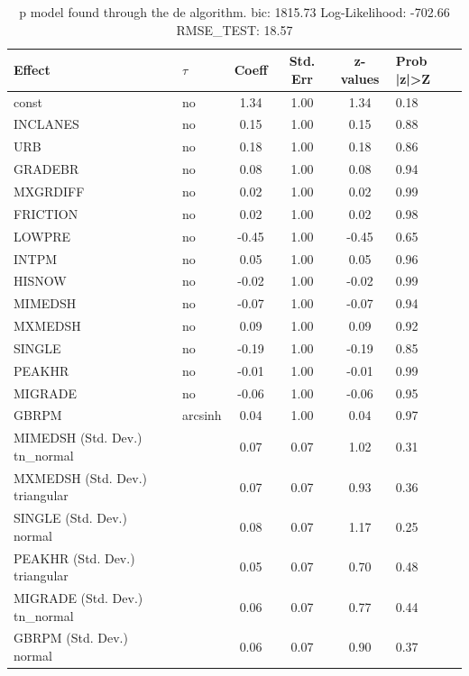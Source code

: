 \begin{table}
	\caption{p model found through the de algorithm. bic: 1815.73 Log-Likelihood: -702.66 RMSE_TEST: 18.57}
	\begin{center}
		\begin{tabular}{|l|l|c|c|c|l|}
			\hline
			Effect & $\tau$ & Coeff & Std. Err & z-values & Prob |z|>Z \\
			\hline
			const & no & 1.34 & 1.00 & 1.34 & 0.18 \\
			\hline
			INCLANES & no & 0.15 & 1.00 & 0.15 & 0.88 \\
			\hline
			URB & no & 0.18 & 1.00 & 0.18 & 0.86 \\
			\hline
			GRADEBR & no & 0.08 & 1.00 & 0.08 & 0.94 \\
			\hline
			MXGRDIFF & no & 0.02 & 1.00 & 0.02 & 0.99 \\
			\hline
			FRICTION & no & 0.02 & 1.00 & 0.02 & 0.98 \\
			\hline
			LOWPRE & no & -0.45 & 1.00 & -0.45 & 0.65 \\
			\hline
			INTPM & no & 0.05 & 1.00 & 0.05 & 0.96 \\
			\hline
			HISNOW & no & -0.02 & 1.00 & -0.02 & 0.99 \\
			\hline
			MIMEDSH & no & -0.07 & 1.00 & -0.07 & 0.94 \\
			\hline
			MXMEDSH & no & 0.09 & 1.00 & 0.09 & 0.92 \\
			\hline
			SINGLE & no & -0.19 & 1.00 & -0.19 & 0.85 \\
			\hline
			PEAKHR & no & -0.01 & 1.00 & -0.01 & 0.99 \\
			\hline
			MIGRADE & no & -0.06 & 1.00 & -0.06 & 0.95 \\
			\hline
			GBRPM & arcsinh & 0.04 & 1.00 & 0.04 & 0.97 \\
			\hline
			MIMEDSH (Std. Dev.) tn_normal &  & 0.07 & 0.07 & 1.02 & 0.31 \\
			\hline
			MXMEDSH (Std. Dev.) triangular &  & 0.07 & 0.07 & 0.93 & 0.36 \\
			\hline
			SINGLE (Std. Dev.) normal &  & 0.08 & 0.07 & 1.17 & 0.25 \\
			\hline
			PEAKHR (Std. Dev.) triangular &  & 0.05 & 0.07 & 0.70 & 0.48 \\
			\hline
			MIGRADE (Std. Dev.) tn_normal &  & 0.06 & 0.07 & 0.77 & 0.44 \\
			\hline
			GBRPM (Std. Dev.) normal &  & 0.06 & 0.07 & 0.90 & 0.37 \\
			\hline
		\end{tabular}
	\end{center}
\end{table}